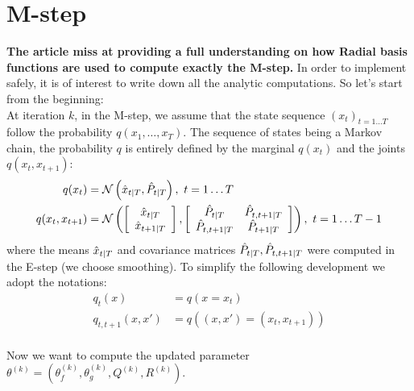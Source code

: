 \section{M-step}

\textbf{The article miss at providing a full understanding on how Radial basis functions are used to compute exactly the M-step.} In order to implement safely, it is of interest to write down all the analytic computations. So let's start from the beginning:\\

At iteration $k$, in the M-step, we assume that the state sequence $(x_t)_{t=1 \ldots T}$ follow the probability $q \left(x_1, \ldots ,x_T \right)$. The sequence of states being a Markov chain, the probability $q$ is entirely defined by the marginal $q(x_t)$ and the joints $q(x_t,x_{t+1})$:
\begin{align*}
  q(x_t) &= \mathcal{N}\left( \hat{x}_{t \mathbin{\vert} T}, \hat{P}_{t \mathbin{\vert} T} \right), \  t=1 \ldots T\\
  q(x_t, x_{t+1}) &=
  \mathcal{N}
    \left(
      \left[
        \begin{array}{c} \hat{x}_{t \mathbin{\vert} T} \\ \hat{x}_{t+1 \mathbin{\vert} T} \end{array}
      \right],
      \left[
        \begin{array}{cc} \hat{P}_{t \mathbin{\vert} T} & \hat{P}_{t,t+1 \mathbin{\vert} T}\\ \hat{P}_{t,t+1 \mathbin{\vert} T} & \hat{P}_{t+1 \mathbin{\vert} T} \end{array}
      \right]
    \right), \  t=1 \ldots T-1\\
\end{align*}
where the means $\hat{x}_{t \mathbin{\vert} T}$ and covariance matrices $\hat{P}_{t \mathbin{\vert} T}, \hat{P}_{t,t+1 \mathbin{\vert} T}$ were computed in the E-step (we choose smoothing).
To simplify the following development we adopt the notations:
\begin{align*}
  q_t(x) &= q(x = x_t)\\
  q_{t,t+1}(x,x') &= q \left((x,x') = (x_t, x_{t+1})\right)\\
\end{align*}

Now we want to compute the updated parameter $\theta^{(k)} = \left( \theta_f^{(k)}, \theta_g^{(k)}, Q^{(k)}, R^{(k)} \right)$.

